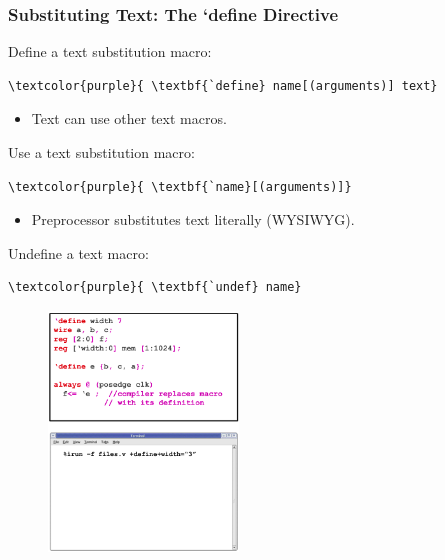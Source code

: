 \documentclass[t, notes, xcolor=table]{beamer}
\begin{document}
\begin{frame}[fragile]
\frametitle{Substituting Text: The `define Directive}
\scriptsize{
\begin{multicols}{2}
Define a text substitution macro:
\begin{Verbatim}[commandchars=\\\{\}, tabsize=2]
\textcolor{purple}{	\textbf{`define} name[(arguments)] text}
\end{Verbatim}
\begin{itemize}
\item Text can use other text macros.
\end{itemize}

\vspace{10pt}
Use a text substitution macro:
\begin{Verbatim}[commandchars=\\\{\}, tabsize=2]
\textcolor{purple}{	\textbf{`name}[(arguments)]}
\end{Verbatim}
\begin{itemize}
\item Preprocessor substitutes text literally (WYSIWYG).
\end{itemize}

\vspace{10pt}
Undefine a text macro:
\begin{Verbatim}[commandchars=\\\{\}, tabsize=2]
\textcolor{purple}{	\textbf{`undef} name}
\end{Verbatim}
\vfill
\columnbreak
\begin{figure}
    \includegraphics[width=0.45\textwidth]{img/11_define.png}
\end{figure}
\end{multicols}
}
\end{frame}
\end{document}
